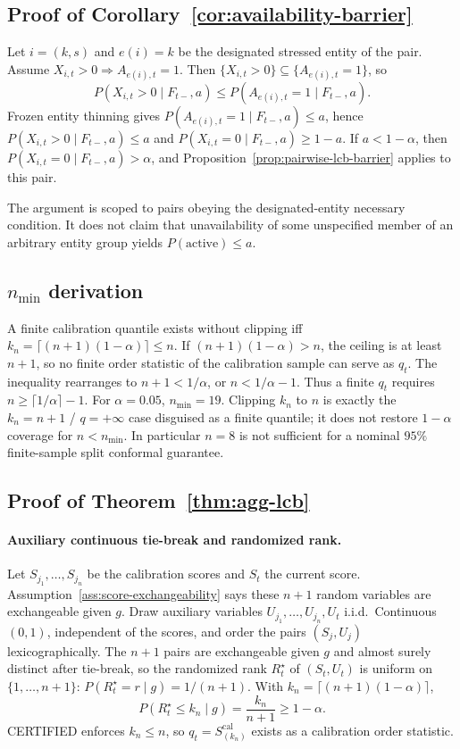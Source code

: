 \subsection{Proof of Corollary~\ref{cor:availability-barrier}}
\label{app:proof_availability_barrier}

Let $i=(k,s)$ and $e(i)=k$ be the designated stressed entity of the pair.
Assume $X_{i,t}>0\Rightarrow A_{e(i),t}=1$.  Then
$\{X_{i,t}>0\}\subseteq\{A_{e(i),t}=1\}$, so
\[
 P(X_{i,t}>0\mid F_{t-},a)
 \le
 P(A_{e(i),t}=1\mid F_{t-},a).
\]
Frozen entity thinning gives $P(A_{e(i),t}=1\mid F_{t-},a)\le a$, hence
$P(X_{i,t}>0\mid F_{t-},a)\le a$ and $P(X_{i,t}=0\mid F_{t-},a)\ge 1-a$.
If $a<1-\alpha$, then $P(X_{i,t}=0\mid F_{t-},a)>\alpha$, and
Proposition~\ref{prop:pairwise-lcb-barrier} applies to this pair.

The argument is scoped to pairs obeying the designated-entity necessary
condition.  It does not claim that unavailability of some unspecified member
of an arbitrary entity group yields $P(\mathrm{active})\le a$.

\subsection{$n_{\min}$ derivation}
\label{app:nmin}

A finite calibration quantile exists without clipping iff
$k_n=\lceil(n+1)(1-\alpha)\rceil\le n$.  If $(n+1)(1-\alpha)>n$, the ceiling is
at least $n+1$, so no finite order statistic of the calibration sample can
serve as $q_t$.  The inequality rearranges to $n+1<1/\alpha$, or
$n<1/\alpha-1$.  Thus a finite $q_t$ requires
$n\ge\lceil 1/\alpha\rceil-1$.  For $\alpha=0.05$, $n_{\min}=19$.  Clipping
$k_n$ to $n$ is exactly the $k_n=n+1$ / $q=+\infty$ case disguised as a finite
quantile; it does not restore $1-\alpha$ coverage for $n<n_{\min}$.  In
particular $n=8$ is not sufficient for a nominal $95\%$ finite-sample split
conformal guarantee.

\subsection{Proof of Theorem~\ref{thm:agg-lcb}}
\label{app:proof_agg_lcb}

\paragraph{Auxiliary continuous tie-break and randomized rank.}
Let $S_{j_1},\ldots,S_{j_n}$ be the calibration scores and $S_t$ the current
score.  Assumption~\ref{ass:score-exchangeability} says these $n+1$ random
variables are exchangeable given $g$.  Draw auxiliary variables
$U_{j_1},\ldots,U_{j_n},U_t$ i.i.d.\ Continuous$(0,1)$, independent of the
scores, and order the pairs $(S_j,U_j)$ lexicographically.  The $n+1$ pairs
are exchangeable given $g$ and almost surely distinct after tie-break, so the
randomized rank $R_t^\star$ of $(S_t,U_t)$ is uniform on $\{1,\ldots,n+1\}$:
$P(R_t^\star=r\mid g)=1/(n+1)$.  With
$k_n=\lceil(n+1)(1-\alpha)\rceil$,
\[
 P(R_t^\star\le k_n\mid g)=\frac{k_n}{n+1}\ge 1-\alpha.
\]
CERTIFIED enforces $k_n\le n$, so $q_t=S_{(k_n)}^{\mathrm{cal}}$ exists as a
calibration order statistic.

